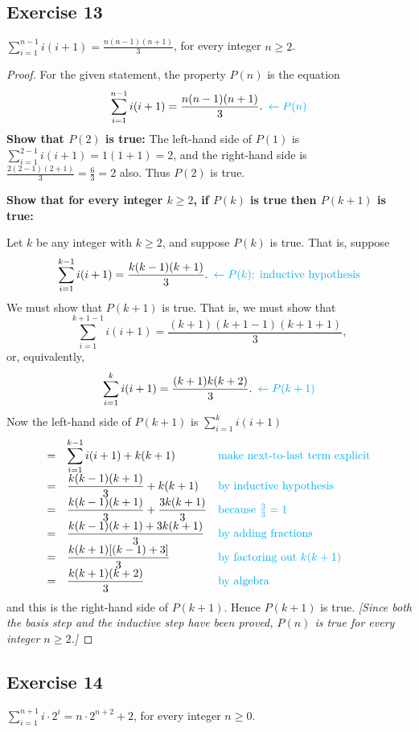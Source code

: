 \documentclass[14pt]{extarticle}
\newcommand{\dps}{\displaystyle}
\newcommand{\from}{\leftarrow}
\newcommand{\cy}{\color{cyan}}
\begin{document}
\subsection{Exercise 13}
$\dps \sum_{i=1}^{n-1}i(i+1) = \frac{n(n-1)(n+1)}{3}$, for every integer $n \geq 2$.

\begin{proof}
For the given statement, the property $P(n)$ is the equation
\[
\dps \sum_{i=1}^{n-1}i(i+1) = \frac{n(n-1)(n+1)}{3}. \,\,\, {\cy \from P(n)}
\]
{\bf Show that $P(2)$ is true:} The left-hand side of $P(1)$ is $\dps \sum_{i=1}^{2-1}i(i+1) = 1(1+1) = 2$, and the right-hand side is $\dps \frac{2(2-1)(2+1)}{3} = \frac{6}{3} = 2$ also. Thus $P(2)$ is true.

{\bf Show that for every integer $k \geq 2$, if $P(k)$ is true then $P(k + 1)$ is true:}

Let $k$ be any integer with $k \geq 2$, and suppose $P(k)$ is true. That is, suppose
\[
\dps \sum_{i=1}^{k-1}i(i+1) = \frac{k(k-1)(k+1)}{3}. \,\,\, {\cy \from P(k) \text{: inductive hypothesis}}
\]
We must show that $P(k + 1)$ is true. That is, we must show that
\[
\dps \sum_{i=1}^{k+1-1}i(i+1) = \frac{(k+1)(k+1-1)(k+1+1)}{3},
\]
or, equivalently,
\[
\dps \sum_{i=1}^{k}i(i+1) = \frac{(k+1)k(k+2)}{3}. \,\,\,{\cy \from P(k+1)}
\]
Now the left-hand side of $P(k + 1)$ is $\dps \sum_{i=1}^{k}i(i+1)$
\[
\begin{array}{lll}
= & \dps \sum_{i=1}^{k-1}i(i+1) + k(k+1) & \text{\cy make next-to-last term explicit} \\
= & \dps \frac{k(k-1)(k+1)}{3} + k(k+1) & \text{\cy by inductive hypothesis} \\
= & \dps \frac{k(k-1)(k+1)}{3} + \frac{3k(k+1)}{3} & \text{\cy because $\frac{3}{3} = 1$} \\
= & \dps \frac{k(k-1)(k+1) + 3k(k+1)}{3} & \text{\cy by adding fractions} \\
= & \dps \frac{k(k+1)[(k-1) + 3]}{3} & \text{\cy by factoring out $k(k+1)$} \\
= & \dps \frac{k(k+1)(k+2)}{3} & \text{\cy by algebra}
\end{array}
\]
and this is the right-hand side of $P(k + 1)$. Hence $P(k + 1)$ is true. {\it [Since both the basis step and the inductive step have been proved, $P(n)$ is true for every integer $n \geq 2$.]}
\end{proof}

\subsection{Exercise 14}
$\dps \sum_{i=1}^{n+1}i \cdot 2^i = n \cdot 2^{n+2} + 2$, for every integer $n \geq 0$.
\end{document}
